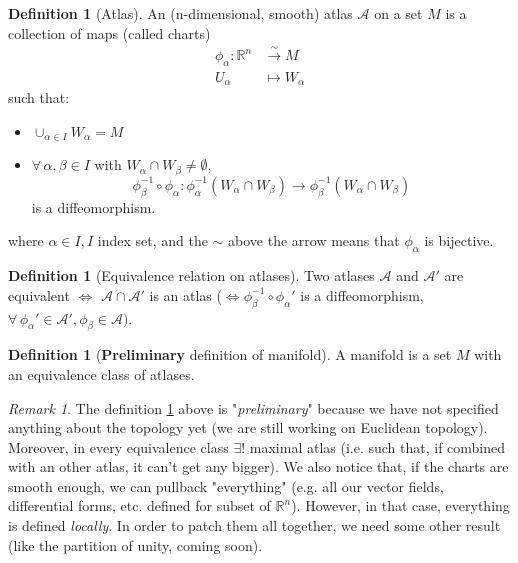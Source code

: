 \documentclass[a4paper,11pt,titlepage]{article}
\numberwithin{equation}{section}
\theoremstyle{definition}
\newtheorem{definition}[theorem]{Definition}
\theoremstyle{remark}
\newtheorem{remark}[theorem]{Remark}
\newcommand{\rfield}{\mathbb{R}}
\begin{document}
\begin{definition}[Atlas] \label{atlasdef}
  An (n-dimensional, smooth) atlas $\mathcal{A}$ on a set $M$ is a collection of maps (called charts)
  \begin{align}
    \phi_{\alpha} \colon \rfield^n &\overset{\sim}{\rightarrow} M \\
    U_{\alpha} &\mapsto W_{\alpha} \nonumber
  \end{align}
  such that:
  \begin{itemize}
    \item $\cup_{\alpha \in I} W_{\alpha} = M$
    \item $\forall\, \alpha, \beta \in I$ with $W_{\alpha} \cap W_{\beta} \not = \emptyset$,
    $$\phi^{-1}_{\beta} \circ \phi_{\alpha} \colon \phi^{-1}_{\alpha}(W_{\alpha} \cap W_{\beta}) \rightarrow \phi_{\beta}^{-1}(W_{\alpha} \cap W_{\beta})$$
    is a diffeomorphism.
  \end{itemize}
  where $\alpha \in I, I$ index set, and the $\sim$ above the arrow means that $\phi_{\alpha}$ is bijective.
\end{definition}

\begin{definition} [Equivalence relation on atlases]
  Two atlases $\mathcal{A}$ and $\mathcal{A'}$ are equivalent $\Leftrightarrow$ $\mathcal{A} \cap \mathcal{A'}$ is an atlas ($\Leftrightarrow \phi_{\beta}^{-1} \circ \phi_{\alpha}'$ is a diffeomorphism, $\forall\, \phi_{\alpha}' \in \mathcal{A}', \phi_{\beta} \in \mathcal{A})$.
\end{definition}

\begin{definition}[\textbf{Preliminary} definition of manifold] \label{manifoldprel}
  A manifold is a set $M$ with an equivalence class of atlases.
\end{definition}

\begin{remark}
  The definition \ref{manifoldprel} above is "\textit{preliminary}" because we have not specified anything about the topology yet (we are still working on Euclidean topology). Moreover, in every equivalence class $\exists!$ maximal atlas (i.e. such that, if combined with an other atlas, it can't get any bigger). We also notice that, if the charts are smooth enough, we can pullback "everything" (e.g. all our vector fields, differential forms, etc. defined for subset of $\rfield^n$). However, in that case, everything is defined \textit{locally}. In order to patch them all together, we need some other result (like the partition of unity, coming soon).
\end{remark}
\end{document}
